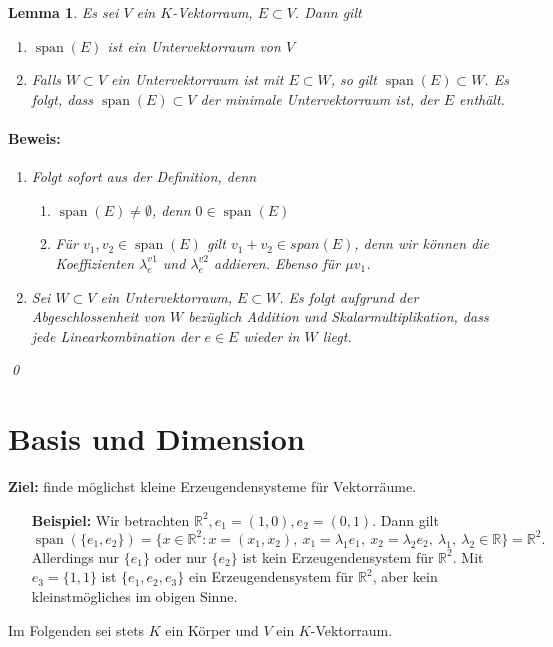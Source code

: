 \documentclass{report}
\newcommand{\lb}{\lambda}
\newcommand{\R}{\mathbb{R}}
\DeclareMathOperator{\Span}{span}
\theoremstyle{customrem}
\theoremstyle{customdef}
\newtheorem{lemma}[definition]{Lemma}
\renewenvironment{proof}{\paragraph{Beweis: }}{\qed}
\begin{document}
	\begin{lemma}
		Es sei \(V\) ein \(K\)-Vektorraum, \(E \subset V\). Dann gilt
		\begin{enumerate}
			\item \(\Span(E)\) ist ein Untervektorraum von \(V\)
			\item Falls \(W \subset V\) ein Untervektorraum ist mit \(E \subset W\), so gilt \(\Span(E) \subset W\). Es folgt, dass \(\Span(E) \subset V\) der minimale Untervektorraum ist, der \(E\) enthält.
		\end{enumerate}
		\vspace{.2cm}
		\begin{proof}
			\begin{enumerate}
				\item Folgt sofort aus der Definition, denn 
				\begin{enumerate}
					\item \(\Span(E) \neq \emptyset\), denn \(0 \in \Span(E)\)
					\item Für \(v_1, v_2 \in \Span(E)\) gilt \(v_1 + v_2 \in span(E)\), denn wir können die Koeffizienten \(\lb_e^{v1}\) und \(\lb_e^{v2}\) addieren. Ebenso für \(\mu v_1\).
				\end{enumerate}
				\item Sei \(W \subset V\) ein Untervektorraum, \(E \subset W\). Es folgt aufgrund der Abgeschlossenheit von \(W\) bezüglich Addition und Skalarmultiplikation, dass jede Linearkombination der \(e \in E\) wieder in \(W\) liegt.
			\end{enumerate}
		\end{proof}
	\end{lemma}
	
	\section{Basis und Dimension}
	\hspace{-.25cm}\textbf{Ziel:} finde möglichst kleine Erzeugendensysteme für Vektorräume.
	\begin{enumerate}[leftmargin=1.4cm]
		\item[\textbf{Beispiel:}]Wir betrachten \(\R^2, e_1=(1, 0), e_2 = (0,1)\). Dann gilt \[\Span(\{e_1, e_2\})
		= \{x \in \R^2 : x = (x_1, x_2),\ x_1 = \lb_1 e_1,\ x_2 = \lb_2 e_2,\ \lb_1,\ \lb_2 \in \R\} = \R^2.\] 
		Allerdings nur \(\{e_1\}\) oder nur \(\{e_2\}\) ist kein Erzeugendensystem für \(\R^2\). Mit \(e_3 = \{1, 1\}\) ist \(\{e_1, e_2, e_3\}\) ein Erzeugendensystem für \(\R^2\), aber kein kleinstmögliches im obigen Sinne.
	\end{enumerate}
	\hspace{-.25cm}Im Folgenden sei stets \(K\) ein Körper und \(V\) ein \(K\)-Vektorraum.
	
\end{document}
